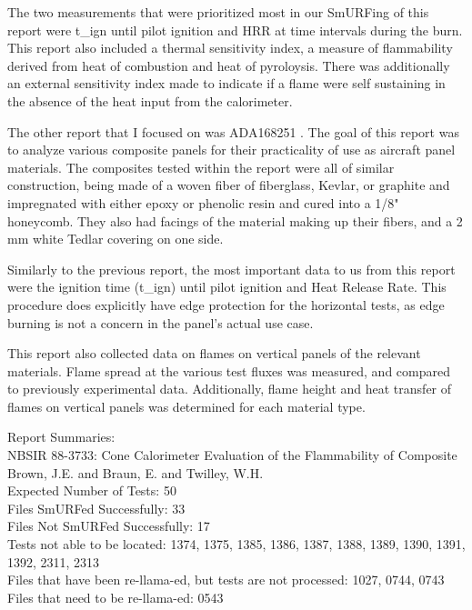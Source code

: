 \documentclass{abstract}
\begin{document}
 The two measurements that were prioritized most in our SmURFing of this report  were t\_ign until pilot ignition and HRR at time intervals during the burn. This report also included a thermal sensitivity index, a measure of flammability derived from heat of combustion and heat of pyroloysis. There was additionally an external sensitivity index made to indicate if a flame were self sustaining in the absence of the heat input from the calorimeter.
  
 The other report that I focused on was ADA168251 \cite{ADA168251}. The goal of this report was to analyze various composite panels for their practicality of use as aircraft panel materials. The composites tested within the report were all of similar construction, being made of a woven fiber of fiberglass, Kevlar, or graphite and impregnated with either epoxy or phenolic resin and cured into a 1/8" honeycomb. They also had facings of the material making up their fibers, and a 2 mm white Tedlar covering on one side. 
 
 Similarly to the previous report, the most important data to us from this report were the ignition time (t\_ign) until pilot ignition and Heat Release Rate. This procedure does explicitly have edge protection for the horizontal tests, as edge burning is not a concern in the panel's actual use case. 
 
 This report also collected data on flames on vertical panels of the relevant materials. Flame spread at the various test fluxes was measured, and compared to previously experimental data. Additionally, flame height and heat transfer of flames on vertical panels was determined for each material type. 
 
 


 Report Summaries:\\
 NBSIR 88-3733: Cone Calorimeter Evaluation of the Flammability of Composite \\
 Brown, J.E. and Braun, E. and Twilley, W.H. \\
 Expected Number of Tests: 50 \\
 Files SmURFed Successfully: 33 \\
 Files Not SmURFed Successfully: 17\\
 Tests not able to be located: 1374, 1375, 1385, 1386, 1387, 1388, 1389, 1390, 1391, 1392, 2311, 2313\\
 Files that have been re-llama-ed, but tests are not processed: 1027, 0744, 0743\\
 Files that need to be re-llama-ed: 0543
 
\end{document}

